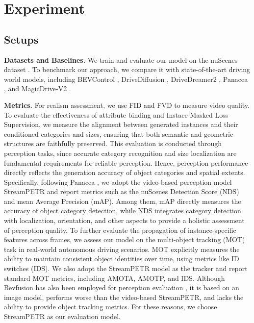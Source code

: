 \documentclass{article} %
\begin{document}
\section{Experiment}
\label{section: exp}


\subsection{Setups}
\noindent \textbf{Datasets and Baselines.} 
We train and evaluate our model on the nuScenes dataset \cite{nuScenes}. To benchmark our approach, we compare it with state-of-the-art driving world models, including BEVControl \cite{bevcontrol}, DriveDiffusion \cite{li2023drivingdiffusionlayoutguidedmultiviewdriving}, DriveDreamer2 \cite{drivedreamer2}, Panacea \cite{wen2024panacea}, and MagicDrive-V2 \cite{gao2024magicdrivedithighresolutionlongvideo}.


\noindent \textbf{Metrics.}
For realism assessment, we use FID \cite{FID} and FVD \cite{Thomas2018fvd} to measure video quality. 
To evaluate the effectiveness of attribute binding and Instace Masked Loss Supervision, we measure the alignment between generated instances and their conditioned categories and sizes, ensuring that both semantic and geometric structures are faithfully preserved. This evaluation is conducted through perception tasks, since accurate category recognition and size localization are fundamental requirements for reliable perception. Hence, perception performance directly reflects the generation accuracy of object categories and spatial extents. Specifically, following Panacea \cite{wen2024panacea}, we adopt the video-based perception model StreamPETR \cite{streampetr} and report metrics such as the nuScenes Detection Score (NDS) and mean Average Precision (mAP). Among them, mAP directly measures the accuracy of object category detection, while NDS integrates category detection with localization, orientation, and other aspects to provide a holistic assessment of perception quality. 
%
To further evaluate the propagation of instance-specific features across frames, we assess our model on the multi-object tracking (MOT) task in real-world autonomous driving scenarios. MOT explicitly measures the ability to maintain consistent object identities over time, using metrics like ID switches (IDS). We also adopt the StreamPETR model \cite{streampetr} as the tracker and report standard MOT metrics, including AMOTA, AMOTP, and IDS.
%
Although Bevfusion \cite{liu2023bevfusion} has also been employed for perception evaluation \cite{gao2023magicdrive}, it is based on an image model, performs worse than the video-based StreamPETR, and lacks the ability to provide object tracking metrics. For these reasons, we choose StreamPETR as our evaluation model.
\end{document}
